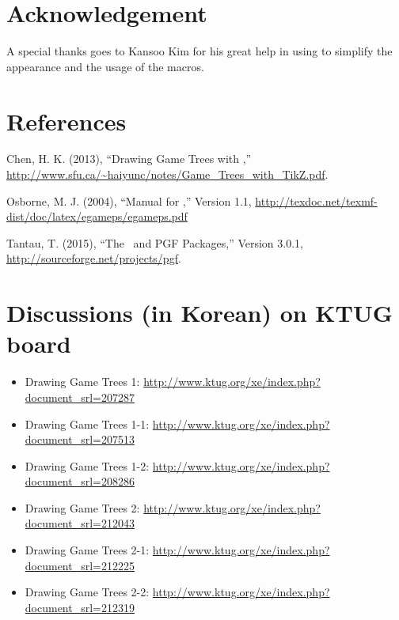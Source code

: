 \section{Acknowledgement}

A special thanks goes to Kansoo Kim for his great help in using  to simplify the appearance and the usage of the macros.


\section{References}
\hpara{}Chen, H. K. (2013), ``Drawing Game Trees with \Tikz,'' \url{http://www.sfu.ca/~haiyunc/notes/Game_Trees_with_TikZ.pdf}.

\hpara{}Osborne, M. J. (2004), ``Manual for ,'' Version 1.1, \url{http://texdoc.net/texmf-dist/doc/latex/egameps/egameps.pdf}

\hpara{}Tantau, T. (2015), ``The \Tikz\ and PGF Packages,'' Version 3.0.1, \url{http://sourceforge.net/projects/pgf}.

\section*{Discussions (in Korean) on KTUG board}

\begin{itemize}
\item Drawing Game Trees 1: \url{http://www.ktug.org/xe/index.php?document_srl=207287}

\item Drawing Game Trees 1-1: \url{http://www.ktug.org/xe/index.php?document_srl=207513}

\item Drawing Game Trees 1-2:
\url{http://www.ktug.org/xe/index.php?document_srl=208286}

\item Drawing Game Trees 2: \url{http://www.ktug.org/xe/index.php?document_srl=212043}

\item Drawing Game Trees 2-1:
\url{http://www.ktug.org/xe/index.php?document_srl=212225}

\item Drawing Game Trees 2-2:
\url{http://www.ktug.org/xe/index.php?document_srl=212319}
\end{itemize}
